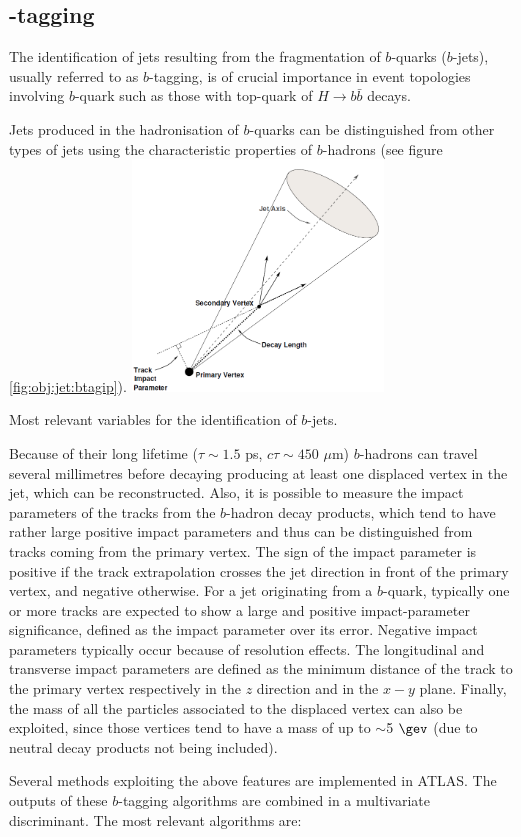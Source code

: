 \subsection[$b$-tagging]{-tagging}
\label{sec:obj:jets:btagging}
The identification of jets resulting from the fragmentation of $b$-quarks ($b$-jets), usually referred to as $b$-tagging, is of crucial importance in event topologies involving $b$-quark such as those with top-quark of $H \to b\bar{b}$ decays.\par
Jets produced in the hadronisation of $b$-quarks can be distinguished from other types of jets using the characteristic properties of $b$-hadrons (see figure \ref{fig:obj:jet:btagip}).
\bfig[t!]
\centering
\includegraphics[width=0.5\textwidth]{figures/Objects/btagip.png}
\captionsetup{width=0.85\textwidth} \caption{\small Most relevant variables for the identification of $b$-jets.}
\label{fig:obj:jet:btagip}
\efig
Because of their long lifetime ($\tau\sim1.5$ ps, $c\tau \sim450$ $\mu$m) $b$-hadrons can travel several millimetres before decaying producing at least one displaced vertex in the jet, which can be reconstructed. Also, it is possible to measure the impact parameters of the tracks from the $b$-hadron decay products, which tend to have rather large positive impact parameters and thus can be distinguished from tracks coming from the primary vertex. The sign of the impact parameter is positive if the track extrapolation crosses the jet direction in front of the primary vertex, and negative otherwise. For a jet originating from a $b$-quark, typically one or more tracks are expected to show a large and positive impact-parameter significance, defined as the impact parameter over its error. Negative impact parameters typically occur because of resolution effects. The longitudinal and transverse impact parameters are defined as the minimum distance of the track to the primary vertex respectively in the $z$ direction and in the $x-y$ plane. Finally, the mass of all the particles associated to the displaced vertex can also be exploited, since those vertices tend to have a mass of up to $\sim$5 $\gev$ (due to neutral decay products not being included).\par
Several methods exploiting the above features are implemented in ATLAS. The outputs of these $b$-tagging algorithms are combined in a multivariate discriminant. The most relevant algorithms are: 

